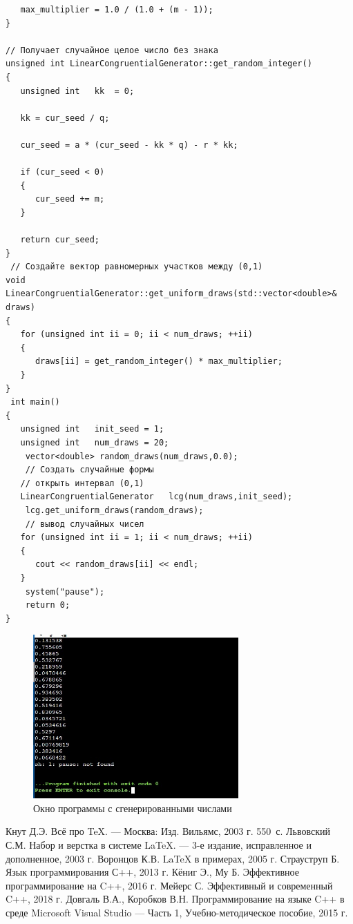 \documentclass[12pt,a4paper]{scrartcl}
\begin{document}
\begin{verbatim}
   max_multiplier = 1.0 / (1.0 + (m - 1));
}
 
// Получает случайное целое число без знака
unsigned int LinearCongruentialGenerator::get_random_integer()
{
   unsigned int   kk  = 0;
 
   kk = cur_seed / q;
   
   cur_seed = a * (cur_seed - kk * q) - r * kk;
 
   if (cur_seed < 0)
   {
      cur_seed += m;
   }
 
   return cur_seed;
}
 // Создайте вектор равномерных участков между (0,1)
void LinearCongruentialGenerator::get_uniform_draws(std::vector<double>& draws)
{
   for (unsigned int ii = 0; ii < num_draws; ++ii)
   {
      draws[ii] = get_random_integer() * max_multiplier;
   }
}
 int main()
{                 
   unsigned int   init_seed = 1;
   unsigned int   num_draws = 20;
    vector<double> random_draws(num_draws,0.0);
    // Cоздать случайные формы
   // открыть интервал (0,1) 
   LinearCongruentialGenerator   lcg(num_draws,init_seed);
    lcg.get_uniform_draws(random_draws);
    // вывод случайных чисел
   for (unsigned int ii = 1; ii < num_draws; ++ii)
   {
      cout << random_draws[ii] << endl;
   }
    system("pause");
    return 0;
}
\end{verbatim}

\begin{figure}[!b]
	\centering
	\includegraphics[width=0.7\textwidth]{Рисунок 1.jpg}
	\caption{Окно программы с сгенерированными числами}\label{fig:par}
\end{figure}

\begin{thebibliography}{9}
Кнут Д.Э. Всё про \TeX. \newblock --- Москва: Изд. Вильямс, 2003 г. 550~с.
Львовский С.М. Набор и верстка в системе \LaTeX{}. \newblock --- 3-е издание, исправленное и дополненное, 2003 г.
Воронцов К.В. \LaTeX{} в примерах, 2005 г.
 Страуструп Б. Язык программирования С++, 2013 г.
 Кёниг Э., Му Б. Эффективное программирование на C++, 2016 г.
 Мейерс С. Эффективный и современный C++, 2018 г.
 Довгаль В.А., Коробков В.Н. Программирование на языке C++ в среде Microsoft Visual Studio --- Часть 1, Учебно-методическое пособие, 2015 г.
\end{thebibliography}
\end{document}
